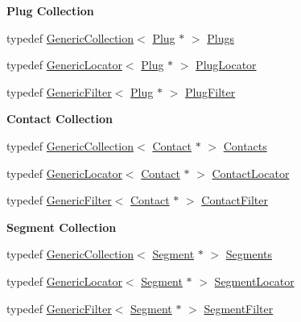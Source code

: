 \begin{Indent}\textbf{ Plug Collection}\par
\begin{DoxyCompactItemize}
\item 
typedef \hyperlink{classHurricane_1_1GenericCollection}{Generic\+Collection}$<$ \hyperlink{classHurricane_1_1Plug}{Plug} $\ast$ $>$ \hyperlink{namespaceHurricane_ac8335d2057483ee7a935c15a9460c64f}{Plugs}
\item 
typedef \hyperlink{classHurricane_1_1GenericLocator}{Generic\+Locator}$<$ \hyperlink{classHurricane_1_1Plug}{Plug} $\ast$ $>$ \hyperlink{namespaceHurricane_a99a5e89f593de242e24a24b632b0534e}{Plug\+Locator}
\item 
typedef \hyperlink{classHurricane_1_1GenericFilter}{Generic\+Filter}$<$ \hyperlink{classHurricane_1_1Plug}{Plug} $\ast$ $>$ \hyperlink{namespaceHurricane_ad6b0bd4bdff4c52e6163b9f54e3e5c92}{Plug\+Filter}
\end{DoxyCompactItemize}
\end{Indent}
\begin{Indent}\textbf{ Contact Collection}\par
\begin{DoxyCompactItemize}
\item 
typedef \hyperlink{classHurricane_1_1GenericCollection}{Generic\+Collection}$<$ \hyperlink{classHurricane_1_1Contact}{Contact} $\ast$ $>$ \hyperlink{namespaceHurricane_a1e6a8ab09f688509bd727b3fee02d0d2}{Contacts}
\item 
typedef \hyperlink{classHurricane_1_1GenericLocator}{Generic\+Locator}$<$ \hyperlink{classHurricane_1_1Contact}{Contact} $\ast$ $>$ \hyperlink{namespaceHurricane_a244811a7f36de747884f0c1ab1cc1025}{Contact\+Locator}
\item 
typedef \hyperlink{classHurricane_1_1GenericFilter}{Generic\+Filter}$<$ \hyperlink{classHurricane_1_1Contact}{Contact} $\ast$ $>$ \hyperlink{namespaceHurricane_a57f79232601d8739370debec00f89740}{Contact\+Filter}
\end{DoxyCompactItemize}
\end{Indent}
\begin{Indent}\textbf{ Segment Collection}\par
\begin{DoxyCompactItemize}
\item 
typedef \hyperlink{classHurricane_1_1GenericCollection}{Generic\+Collection}$<$ \hyperlink{classHurricane_1_1Segment}{Segment} $\ast$ $>$ \hyperlink{namespaceHurricane_a30748fa53a81cb597d4a13d651238716}{Segments}
\item 
typedef \hyperlink{classHurricane_1_1GenericLocator}{Generic\+Locator}$<$ \hyperlink{classHurricane_1_1Segment}{Segment} $\ast$ $>$ \hyperlink{namespaceHurricane_a37c8302c278e8c1c60c6ffc0222ec4c8}{Segment\+Locator}
\item 
typedef \hyperlink{classHurricane_1_1GenericFilter}{Generic\+Filter}$<$ \hyperlink{classHurricane_1_1Segment}{Segment} $\ast$ $>$ \hyperlink{namespaceHurricane_a891c4a2d614e158d183dada8b0ab1747}{Segment\+Filter}
\end{DoxyCompactItemize}
\end{Indent}
